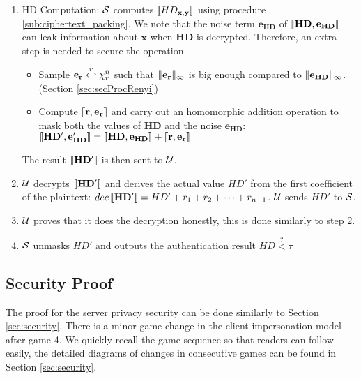 \begin{description}
\begin{enumerate}
\item HD Computation: $\mathcal{S}$ computes $\left\llbracket HD_{\mathbf{x,y}}\right\rrbracket$ using
  procedure \ref{sub:ciphertext_packing}. We note that the noise term
  $\mathbf{e_{HD}}$ of $\left\llbracket\mathbf{HD,e_{HD}}\right\rrbracket$ can leak information about
  $\mathbf{x}$ when $\mathbf{HD}$ is decrypted. Therefore, an extra step is
  needed to secure the operation.
  \begin{itemize}
  \item Sample $\mathbf{e_{r}} \stackrel{r}{\hookleftarrow} \chi_{r}^n$ such that
    $\Vert \mathbf{e_r} \Vert_{\infty}$ is big enough compared to
    $\Vert \mathbf{e_{HD}} \Vert_{\infty}$.(Section \ref{sec:secProcRenyi})
  \item Compute $\left\llbracket\mathbf{r,e_r}\right\rrbracket$ and carry out an homomorphic addition
    operation to mask both the values of $\mathbf{HD}$ and the noise
    $\mathbf{e_{HD}}$:
    $\left\llbracket\mathbf{HD', e'_{HD}}\right\rrbracket = \left\llbracket\mathbf{HD, e_{HD}}\right\rrbracket +
    \left\llbracket\mathbf{r,e_r}\right\rrbracket$
    \end{itemize}
    The result $\left\llbracket\mathbf{HD'}\right\rrbracket$ is then sent to $\mathcal{U}$.
  \item \(\mathcal{U}\) decrypts $\left\llbracket\mathbf{HD'}\right\rrbracket$ and derives the actual value
    ${HD'}$ from the first coefficient of the plaintext:
    \( dec\left\llbracket\mathbf{HD'}\right\rrbracket = HD' + r_1 + r_2 + \dots + r_{n-1} \). \(\mathcal{U}\)
    sends \(HD'\) to \(\mathcal{S}\).
  \item \(\mathcal{U}\) proves that it does the decryption honestly, this is done
    similarly to step 2.
  \item \(\mathcal{S}\) unmasks \(HD'\) and outputs the authentication result
    \(HD \stackrel{?}{<} \tau\)
  \end{enumerate}

\end{description}

\subsection{Security Proof}
\label{sec:protocol2SecurityProof}

The proof for the server privacy security can be done similarly to Section
\ref{sec:security}. There is a minor game change in the client impersonation
model after game 4. We quickly recall the game sequence so that readers can
follow easily, the detailed diagrams of changes in consecutive games can be found in Section \ref{sec:security}.

